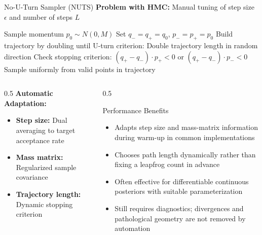 \documentclass[aspectratio=169,11pt]{beamer}
\begin{document}
\begin{frame}{No-U-Turn Sampler (NUTS)}
\textbf{Problem with HMC:} Manual tuning of step size $\epsilon$ and number of steps $L$

\begin{algorithm}[H]
\caption{NUTS Algorithm (Simplified)}
\begin{algorithmic}[1]
\STATE Sample momentum $p_0 \sim N(0, M)$
\STATE Set $q_- = q_+ = q_0$, $p_- = p_+ = p_0$
\STATE Build trajectory by doubling until U-turn criterion:
\STATE Double trajectory length in random direction
\STATE Check stopping criterion: $(q_+ - q_-) \cdot p_+ < 0$ or $(q_+ - q_-) \cdot p_- < 0$
\ENDWHILE
\STATE Sample uniformly from valid points in trajectory
\end{algorithmic}
\end{algorithm}

\begin{columns}
\begin{column}{0.5\textwidth}
\textbf{Automatic Adaptation:}
\begin{itemize}
\item \textbf{Step size:} Dual averaging to target acceptance rate
\item \textbf{Mass matrix:} Regularized sample covariance
\item \textbf{Trajectory length:} Dynamic stopping criterion
\end{itemize}
\end{column}
\begin{column}{0.5\textwidth}
\begin{block}{Performance Benefits}
\begin{itemize}
\item Adapts step size and mass-matrix information during warm-up in common implementations
\item Chooses path length dynamically rather than fixing a leapfrog count in advance
\item Often effective for differentiable continuous posteriors with suitable parameterization
\item Still requires diagnostics; divergences and pathological geometry are not removed by automation
\end{itemize}
\end{block}
\end{column}
\end{columns}
\end{frame}
\end{document}
